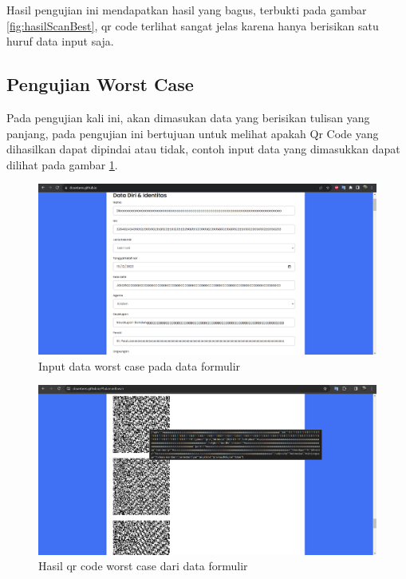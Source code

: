 Hasil pengujian ini mendapatkan hasil yang bagus, terbukti pada gambar \ref{fig:hasilScanBest}, qr code terlihat sangat jelas karena hanya berisikan satu huruf data input saja.

\subsection{Pengujian Worst Case}
\label{sec:pengujianWorst}

Pada pengujian kali ini, akan dimasukan data yang berisikan tulisan yang panjang, pada pengujian ini bertujuan untuk melihat apakah Qr Code yang dihasilkan dapat dipindai atau tidak, contoh input data yang dimasukkan dapat dilihat pada gambar \ref{fig:inputWorstCase}.

\begin{figure}[H]
	\centering
	\includegraphics[scale=0.4]{Gambar/inputWorstCase.png}
	\caption{Input data worst case pada data formulir} 
	\label{fig:inputWorstCase}
\end{figure}

\begin{figure}[H]
	\centering
	\includegraphics[scale=0.4]{Gambar/worst1.png}
	\caption{Hasil qr code worst case dari data formulir} 
	\label{fig:qrCodeWorstCase1}
\end{figure}

